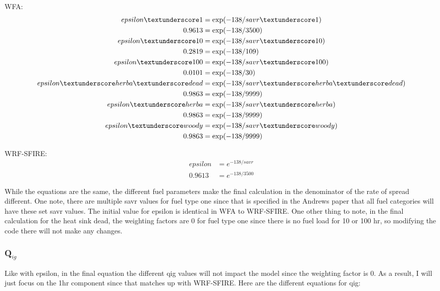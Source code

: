 \documentclass{article}
\newcommand\und{\textunderscore}
\begin{document}
WFA:
\begin{equation}
	\begin{split}
	epsilon\und 1          &= \exp(-138 / savr\und 1) \\
		0.9613 &= \exp (-138 / 3500) \\
	epsilon\und 10         &= \exp(-138 / savr\und 10) \\
		0.2819 &= \exp (-138 / 109) \\
	epsilon\und 100        &= \exp(-138 / savr\und 100) \\
		0.0101 &= \exp (-138 / 30) \\
	epsilon\und herba\und dead &= \exp(-138 / savr\und herba\und dead) \\
		0.9863 &= \exp (-138 / 9999) \\
	epsilon\und herba      &= \exp(-138 / savr\und herba) \\
		0.9863 &= \exp (-138 / 9999) \\
	epsilon\und woody      &= \exp(-138 / savr\und woody) \\
		0.9863 &= \exp (-138 / 9999) 
	\end{split}
\end{equation}


WRF-SFIRE:
\begin{equation}
	\begin{split}
		epsilon &= e ^ {-138 / savr} \\
		0.9613 &= e ^ {-138 / 3500} 
	\end{split}
\end{equation}

While the equations are the same, the different fuel parameters make the final calculation in the denominator of the rate of spread different. One note, there are multiple savr values for fuel type one since that is specified in the Andrews paper that all fuel categories will have these set savr values. The initial value for epsilon is identical in WFA to WRF-SFIRE. One other thing to note, in the final calculation for the heat sink dead, the weighting factors are 0 for fuel type one since there is no fuel load for 10 or 100 hr, so modifying the code there will not make any changes. 


\subsubsection{Q$_{ig}$}

Like with epsilon, in the final equation the different qig values will not impact the model since the weighting factor is 0. As a result, I will just focus on the 1hr component since that matches up with WRF-SFIRE. Here are the different equations for qig:
\end{document}
